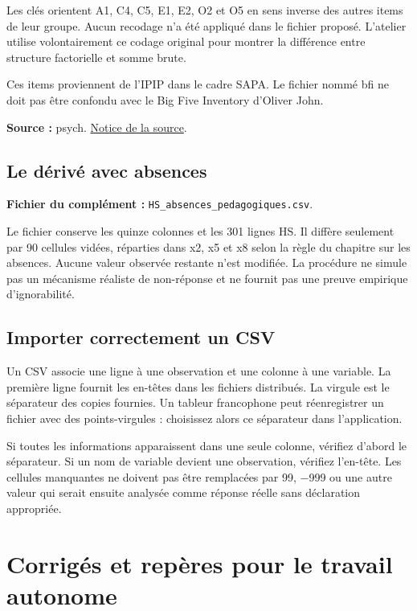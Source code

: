 \documentclass[
  french,
  11pt,
  a4paper,
  DIV=11,
  numbers=noendperiod]{scrreprt}
\begin{document}
Les clés orientent A1, C4, C5, E1, E2, O2 et O5 en sens inverse des
autres items de leur groupe. Aucun recodage n'a été appliqué dans le
fichier proposé. L'atelier utilise volontairement ce codage original
pour montrer la différence entre structure factorielle et somme brute.

Ces items proviennent de l'IPIP dans le cadre SAPA. Le fichier nommé bfi
ne doit pas être confondu avec le Big Five Inventory d'Oliver John.

\textbf{Source :} psych.
\href{https://search.r-project.org/CRAN/refmans/psych/html/bfi.html}{Notice
de la source}.

\section{Le dérivé avec absences}\label{le-duxe9rivuxe9-avec-absences}

\textbf{Fichier du complément :}
\texttt{HS\_absences\_pedagogiques.csv}.

Le fichier conserve les quinze colonnes et les 301 lignes HS. Il diffère
seulement par 90 cellules vidées, réparties dans x2, x5 et x8 selon la
règle du chapitre sur les absences. Aucune valeur observée restante
n'est modifiée. La procédure ne simule pas un mécanisme réaliste de
non-réponse et ne fournit pas une preuve empirique d'ignorabilité.

\section{Importer correctement un
CSV}\label{importer-correctement-un-csv}

Un CSV associe une ligne à une observation et une colonne à une
variable. La première ligne fournit les en-têtes dans les fichiers
distribués. La virgule est le séparateur des copies fournies. Un tableur
francophone peut réenregistrer un fichier avec des points-virgules :
choisissez alors ce séparateur dans l'application.

Si toutes les informations apparaissent dans une seule colonne, vérifiez
d'abord le séparateur. Si un nom de variable devient une observation,
vérifiez l'en-tête. Les cellules manquantes ne doivent pas être
remplacées par 99, −999 ou une autre valeur qui serait ensuite analysée
comme réponse réelle sans déclaration appropriée.

\chapter{Corrigés et repères pour le travail
autonome}\label{sec-corriges}
\end{document}
